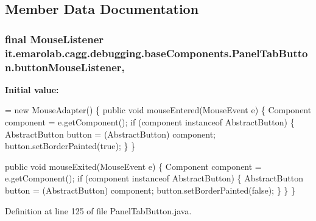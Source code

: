 \subsection{Member Data Documentation}
\hypertarget{classit_1_1emarolab_1_1cagg_1_1debugging_1_1baseComponents_1_1PanelTabButton_ada571f68c939c2796ecfc6baff50a001}{
\subsubsection[{button\-Mouse\-Listener}]{\setlength{\rightskip}{0pt plus 5cm}final Mouse\-Listener it.\-emarolab.\-cagg.\-debugging.\-base\-Components.\-Panel\-Tab\-Button.\-button\-Mouse\-Listener\hspace{0.3cm}{\ttfamily [static]}, {\ttfamily [private]}}}\label{classit_1_1emarolab_1_1cagg_1_1debugging_1_1baseComponents_1_1PanelTabButton_ada571f68c939c2796ecfc6baff50a001}
{\bfseries Initial value\-:}
\begin{DoxyCode}
= \textcolor{keyword}{new} MouseAdapter() \{
        \textcolor{keyword}{public} \textcolor{keywordtype}{void} mouseEntered(MouseEvent e) \{
            Component component = e.getComponent();
            \textcolor{keywordflow}{if} (component instanceof AbstractButton) \{
                AbstractButton button = (AbstractButton) component;
                button.setBorderPainted(\textcolor{keyword}{true});
            \}
        \}

        \textcolor{keyword}{public} \textcolor{keywordtype}{void} mouseExited(MouseEvent e) \{
            Component component = e.getComponent();
            \textcolor{keywordflow}{if} (component instanceof AbstractButton) \{
                AbstractButton button = (AbstractButton) component;
                button.setBorderPainted(\textcolor{keyword}{false});
            \}
        \}
    \}
\end{DoxyCode}


Definition at line 125 of file Panel\-Tab\-Button.\-java.

